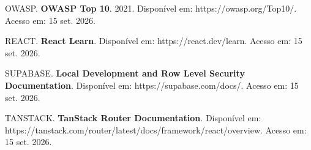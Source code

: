 \documentclass[12pt,a4paper]{article}
\begin{document}
OWASP. 
{\bfseries OWASP Top 10}. 
2021. Disponível em: https://owasp.org/Top10/. Acesso em: 15 set. 2026. 

\bigskip

REACT. 
{\bfseries React Learn}. 
Disponível em: https://react.dev/learn. Acesso em: 15 set. 2026. 

\bigskip

SUPABASE. 
{\bfseries Local Development and Row Level Security Documentation}. 
Disponível em: https://supabase.com/docs/. Acesso em: 15 set. 2026. 

\bigskip

TANSTACK. 
{\bfseries TanStack Router Documentation}. 
Disponível em: https://tanstack.com/router/latest/docs/framework/react/overview. Acesso em: 15 set. 2026. 
\end{document}
